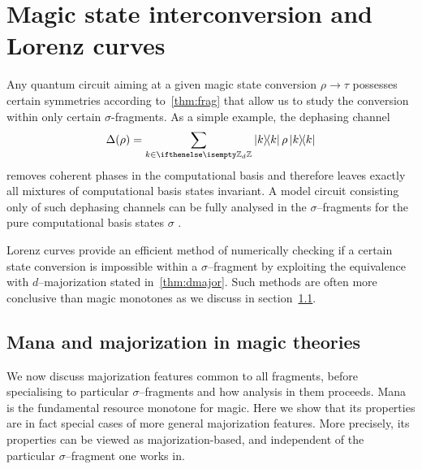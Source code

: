 \documentclass[pra,
aps,
twocolumn,
superscriptaddress,
groupedaddress,
nofootinbib,
reprint
]{revtex4-1}
\begin{document}
 





\section{Magic state interconversion and Lorenz curves}
\label{sec:distill}

Any quantum circuit aiming at a given magic state conversion $\rho \longrightarrow \tau$ possesses certain symmetries according to~\cref{thm:frag} that allow us to study the conversion within only certain $\sigma$-fragments.
As a simple example, the dephasing channel
\begin{equation}\label{eq:dephase}
	\Delta(\rho) = \sum_{k \in \zd} \ketbra{k}{k}\rho\ketbra{k}{k}
\end{equation}
removes coherent phases in the computational basis and therefore leaves exactly all mixtures of computational basis states invariant.
A model circuit consisting only of such dephasing channels can be fully analysed in the $\sigma$--fragments for the pure computational basis states $\sigma$ .

Lorenz curves provide an efficient method of numerically checking if a certain state conversion is impossible within a $\sigma$--fragment by exploiting the equivalence with $d$--majorization stated in~\cref{thm:dmajor}.
Such methods are often more conclusive than magic monotones as we discuss in section~\cref{sec:scmana}.

\subsection{Mana and majorization in magic theories}\label{sec:scmana}
We now discuss majorization features common to all fragments, before specialising to particular $\sigma$--fragments and how analysis in them proceeds. 
Mana is the fundamental resource monotone for magic. 
Here we show that its properties are in fact special cases of more general majorization features. 
More precisely, its properties can be viewed as majorization-based, and independent of the particular $\sigma$--fragment one works in.
\end{document}

